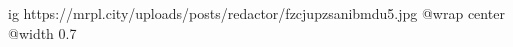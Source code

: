 
 
 
 
 

\ifcmt
  ig https://mrpl.city/uploads/posts/redactor/fzcjupzsanibmdu5.jpg
  @wrap center
  @width 0.7
\fi
